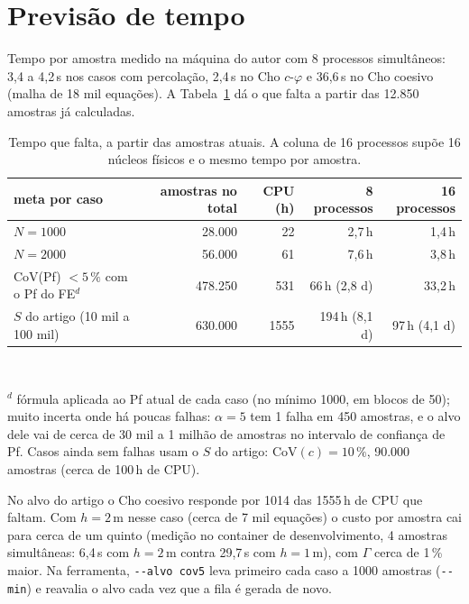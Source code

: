 \documentclass[11pt,a4paper]{article}
\newcommand{\Gam}{\Gamma}
\begin{document}
\section{Previsão de tempo}\label{sec:prev}
Tempo por amostra medido na máquina do autor com 8 processos simultâneos: 3{,}4 a 4{,}2\,s nos casos com percolação, 2{,}4\,s no Cho $c$-$\varphi$ e 36{,}6\,s no Cho coesivo (malha de 18 mil equações). A Tabela~\ref{tab:prev} dá o que falta a partir das 12.850 amostras já calculadas.
\begin{table}[H]\centering\small\caption{Tempo que falta, a partir das amostras atuais. A coluna de 16 processos supõe 16 núcleos físicos e o mesmo tempo por amostra.}\label{tab:prev}\begin{tabular}{lrrrr}\toprule meta por caso & amostras no total & CPU (h) & 8 processos & 16 processos\\\midrule
$N = 1000$ & 28.000 & 22 & 2{,}7\,h & 1{,}4\,h\\
$N = 2000$ & 56.000 & 61 & 7{,}6\,h & 3{,}8\,h\\
CoV(Pf) $< 5\,\%$ com o Pf do FE$^d$ & 478.250 & 531 & 66\,h (2{,}8 d) & 33{,}2\,h\\
$S$ do artigo (10 mil a 100 mil) & 630.000 & 1555 & 194\,h (8{,}1 d) & 97\,h (4{,}1 d)\\
\bottomrule\end{tabular}\\[2pt]\parbox{\linewidth}{\footnotesize $^d$ fórmula aplicada ao Pf atual de cada caso (no mínimo 1000, em blocos de 50); muito incerta onde há poucas falhas: $\alpha = 5$ tem 1 falha em 450 amostras, e o alvo dele vai de cerca de 30 mil a 1 milhão de amostras no intervalo de confiança de Pf. Casos ainda sem falhas usam o $S$ do artigo: $\mathrm{CoV}(c) = 10\,\%$, 90.000 amostras (cerca de 100\,h de CPU).}\end{table}
No alvo do artigo o Cho coesivo responde por 1014 das 1555\,h de CPU que faltam. Com $h = 2$\,m nesse caso (cerca de 7 mil equações) o custo por amostra cai para cerca de um quinto (medição no container de desenvolvimento, 4 amostras simultâneas: 6,4\,s com $h = 2$\,m contra 29,7\,s com $h = 1$\,m), com $\Gam$ cerca de 1\,\% maior. Na ferramenta, \texttt{-{}-alvo cov5} leva primeiro cada caso a 1000 amostras (\texttt{-{}-min}) e reavalia o alvo cada vez que a fila é gerada de novo.
\end{document}
